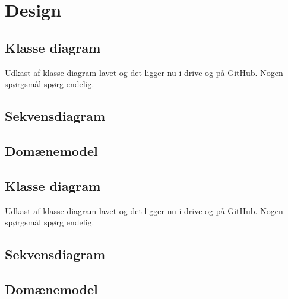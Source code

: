 \section{Design}

\subsection{Klasse diagram}
    Udkast af klasse diagram lavet og det ligger nu i drive og på GitHub. 
    Nogen spørgsmål spørg endelig.
    

\subsection{Sekvensdiagram}


\subsection{Domænemodel}

\subsection{Klasse diagram}
    Udkast af klasse diagram lavet og det ligger nu i drive og på GitHub. 
    Nogen spørgsmål spørg endelig.
    

\subsection{Sekvensdiagram}


\subsection{Domænemodel}